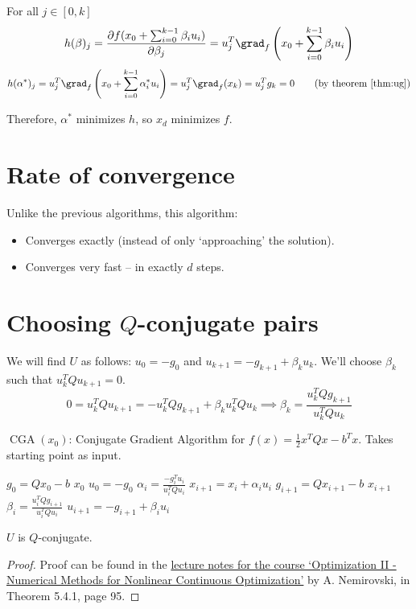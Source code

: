 For all $j \in [0, k]$
\[ h(\beta)_j = \frac{\partial f(x_0 + \sum_{i=0}^{k-1} \beta_i u_i)}{\partial \beta_j}
= u_j^T \grad_f\left(x_0 + \sum_{i=0}^{k-1} \beta_i u_i \right) \]
\[ h(\alpha^*)_j = u_j^T \grad_f\left(x_0 + \sum_{i=0}^{k-1} \alpha_i^* u_i \right)
= u_j^T \grad_f(x_k) = u_j^Tg_k = 0 \tag{by theorem \ref{thm:ug}} \]

Therefore, $\alpha^*$ minimizes $h$, so $x_d$ minimizes $f$.

\section{Rate of convergence}

Unlike the previous algorithms, this algorithm:
\begin{itemize}
\item Converges exactly (instead of only `approaching' the solution).
\item Converges very fast -- in exactly $d$ steps.
\end{itemize}

\section{Choosing \texorpdfstring{$Q$}{Q}-conjugate pairs}

We will find $U$ as follows:
$u_0 = -g_0$ and $u_{k+1} = -g_{k+1} + \beta_k u_k$.
We'll choose $\beta_k$ such that $u_k^TQu_{k+1} = 0$.
\[ 0 = u_k^TQu_{k+1} = -u_k^TQg_{k+1} + \beta_k u_k^TQu_k
\implies \beta_k = \frac{u_k^TQg_{k+1}}{u_k^TQu_k} \]

\begin{algorithm}[H]
\caption{$\operatorname{CGA}(x_0)$: Conjugate Gradient Algorithm for
$f(x) = \frac{1}{2}x^TQx - b^Tx$. Takes starting point as input.}
\label{alg:conj-grad-for-quadratic}
\begin{algorithmic}[1]
\State $g_0 = Qx_0 - b$
    \State \Return $x_0$
\EndIf
\State $u_0 = -g_0$
\For{$i \in [0, \infty)$}
    \State $\displaystyle \alpha_i = \frac{-g_i^Tu_i}{u_i^TQu_i}$
    \State $x_{i+1} = x_i + \alpha_iu_i$
    \State $g_{i+1} = Qx_{i+1} - b$
        \State \Return $x_{i+1}$
    \EndIf
    \State $\displaystyle \beta_i = \frac{u_i^TQg_{i+1}}{u_i^TQu_i}$
    \State $u_{i+1} = -g_{i+1} + \beta_iu_i$
\EndFor
\end{algorithmic}
\end{algorithm}

\begin{theorem}
$U$ is $Q$-conjugate.
\end{theorem}
\begin{proof}
Proof can be found in the
\href{https://www2.isye.gatech.edu/~nemirovs/Lect_OptII.pdf}{
lecture notes for the course
`Optimization II - Numerical Methods for Nonlinear Continuous Optimization'}
by A. Nemirovski, in Theorem 5.4.1, page 95.
\end{proof}

